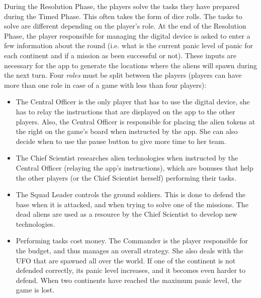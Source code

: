 During the Resolution Phase, the players solve the tasks they have prepared during the Timed Phase. This often takes the form of dice rolls. The tasks to solve are different depending on the player's role. At the end of the Resolution Phase, the player responsible for managing the digital device is asked to enter a few information about the round (i.e. what is the current panic level of panic for each continent and if a mission as been successful or not). These inputs are necessary for the app to generate the locations where the aliens will spawn during the next turn. Four \textit{roles} must be split between the players (players can have more than one role in case of a game with less than four players):
\begin{itemize}
\item The Central Officer is the only player that has to use the digital device, she has to relay the instructions that are displayed on the app to the other players. Also, the Central Officer is responsible for placing the alien tokens at the right on the game's board when instructed by the app. She can also decide when to use the pause button to give more time to her team.
\item The Chief Scientist researches alien technologies when instructed by the Central Officer (relaying the app's instructions), which are bonuses that help the other players (or the Chief Scientist herself) performing their tasks.
\item The Squad Leader controls the ground soldiers. This is done to defend the base when it is attacked, and when trying to solve one of the missions. The dead aliens are used as a resource by the Chief Scientist to develop new technologies.
\item Performing tasks cost money. The Commander is the player responsible for the budget, and thus manages an overall strategy. She also deals with the UFO that are spawned all over the world. If one of the continent is not defended correctly, its panic level increases, and it becomes even harder to defend. When two continents have reached the maximum panic level, the game is lost.
\end{itemize}
